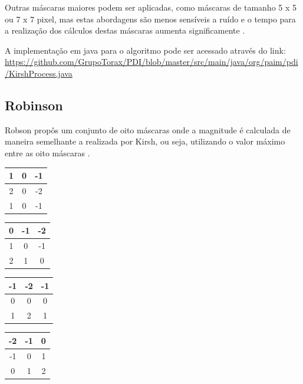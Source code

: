 \documentclass[
	12pt,				%
	oneside,			%
	a4paper,			%
	english,			%
	french,				%
	spanish,			%
	brazil,				%
	]{abntex2}
\begin{document}
Outras máscaras maiores podem ser aplicadas, como máscaras de tamanho 5 x 5 ou 7 x 7 pixel, mas estas abordagens são menos sensíveis a ruído e o tempo para a realização dos cálculos destas máscaras aumenta significamente \cite{pedriniSchwartz:2008}.

A implementação em java para o algoritmo pode ser acessado através do link:
\url{https://github.com/GrupoTorax/PDI/blob/master/src/main/java/org/paim/pdi/KirshProcess.java}

\subsection{Robinson}
Robson propôs um conjunto de oito máscaras onde a magnitude é calculada de maneira semelhante a realizada por Kirsh, ou seja, utilizando o valor máximo entre as oito máscaras \cite{pedriniSchwartz:2008}. 

\begin{tabular}{|c|c|c|}
    \hline
     1 &  0 & -1   \\ \hline
	 2 &  0 & -2   \\ \hline   
	 1 &  0 & -1   \\ \hline   
\end{tabular}
\begin{tabular}{|c|c|c|}
    \hline
     0 & -1 & -2   \\ \hline
	 1 &  0 & -1   \\ \hline   
	 2 &  1 &  0   \\ \hline   
\end{tabular}
\begin{tabular}{|c|c|c|}
    \hline
    -1 & -2 & -1   \\ \hline
	 0 &  0 &  0   \\ \hline   
	 1 &  2 &  1   \\ \hline   
\end{tabular}
\begin{tabular}{|c|c|c|}
    \hline
    -2 & -1 &  0   \\ \hline
	-1 &  0 &  1   \\ \hline   
	 0 &  1 &  2   \\ \hline   
\end{tabular}
\end{document}
